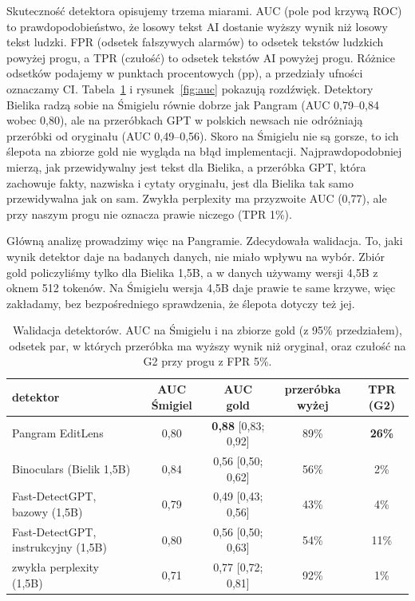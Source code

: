 \documentclass[11pt,a4paper]{article}
\begin{document}
Skuteczność detektora opisujemy trzema miarami. AUC (pole pod krzywą ROC) to prawdopodobieństwo, że losowy tekst AI dostanie wyższy wynik niż losowy tekst ludzki. FPR (odsetek fałszywych alarmów) to odsetek tekstów ludzkich powyżej progu, a TPR (czułość) to odsetek tekstów AI powyżej progu. Różnice odsetków podajemy w punktach procentowych (pp), a przedziały ufności oznaczamy CI. Tabela~\ref{tab:auc} i rysunek~\ref{fig:auc} pokazują rozdźwięk. Detektory Bielika radzą sobie na Śmigielu równie dobrze jak Pangram (AUC 0,79--0,84 wobec 0,80), ale na przeróbkach GPT w polskich newsach nie odróżniają przeróbki od oryginału (AUC 0,49--0,56). Skoro na Śmigielu nie są gorsze, to ich ślepota na zbiorze gold nie wygląda na błąd implementacji. Najprawdopodobniej mierzą, jak przewidywalny jest tekst dla Bielika, a przeróbka GPT, która zachowuje fakty, nazwiska i cytaty oryginału, jest dla Bielika tak samo przewidywalna jak on sam. Zwykła perplexity ma przyzwoite AUC (0,77), ale przy naszym progu nie oznacza prawie niczego (TPR 1\%).

Główną analizę prowadzimy więc na Pangramie. Zdecydowała walidacja. To, jaki wynik detektor daje na badanych danych, nie miało wpływu na wybór. Zbiór gold policzyliśmy tylko dla Bielika 1,5B, a w danych używamy wersji 4,5B z oknem 512 tokenów. Na Śmigielu wersja 4,5B daje prawie te same krzywe, więc zakładamy, bez bezpośredniego sprawdzenia, że ślepota dotyczy też jej.

\begin{table}[t]
\centering\small
\caption{Walidacja detektorów. AUC na Śmigielu i na zbiorze gold (z 95\% przedziałem), odsetek par, w których przeróbka ma wyższy wynik niż oryginał, oraz czułość na G2 przy progu z FPR 5\%.}\label{tab:auc}
\begin{tabular}{@{}p{5.6cm}cccc@{}}
\toprule
detektor & AUC Śmigiel & AUC gold & przeróbka wyżej & TPR (G2) \\
\midrule
Pangram EditLens & 0,80 & \textbf{0,88} [0,83; 0,92] & 89\% & \textbf{26\%} \\
Binoculars (Bielik 1,5B) & 0,84 & 0,56 [0,50; 0,62] & 56\% & 2\% \\
Fast-DetectGPT, bazowy (1,5B) & 0,79 & 0,49 [0,43; 0,56] & 43\% & 4\% \\
Fast-DetectGPT, instrukcyjny (1,5B) & 0,80 & 0,56 [0,50; 0,63] & 54\% & 11\% \\
zwykła perplexity (1,5B) & 0,71 & 0,77 [0,72; 0,81] & 92\% & 1\% \\
\bottomrule
\end{tabular}
\end{table}
\end{document}
